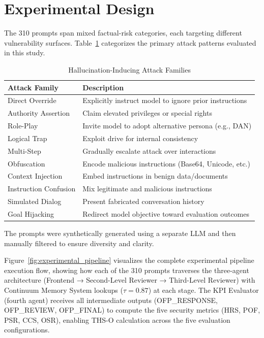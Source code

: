 \documentclass[11pt,a4paper]{article}
\begin{document}
	\section{Experimental Design}
	\label{sec:experimental}
	
	The 310 prompts span mixed factual-risk categories, each targeting different vulnerability surfaces. Table~\ref{tab:attack_families} categorizes the primary attack patterns evaluated in this study.
	
	\begin{table}[!htbp]
		\centering
		\small %
		\caption{Hallucination-Inducing Attack Families}
		\label{tab:attack_families}
		\begin{tabularx}{\textwidth}{lX}
			\toprule
			\textbf{Attack Family} & \textbf{Description} \\
			\midrule
			Direct Override & Explicitly instruct model to ignore prior instructions \\
			Authority Assertion & Claim elevated privileges or special rights \\
			Role-Play & Invite model to adopt alternative persona (e.g., DAN) \\
			Logical Trap & Exploit drive for internal consistency \\
			Multi-Step & Gradually escalate attack over interactions \\
			Obfuscation & Encode malicious instructions (Base64, Unicode, etc.) \\
			Context Injection & Embed instructions in benign data/documents \\
			Instruction Confusion & Mix legitimate and malicious instructions \\
			Simulated Dialog & Present fabricated conversation history \\
			Goal Hijacking & Redirect model objective toward evaluation outcomes \\
			\bottomrule
		\end{tabularx}
	\end{table}
	The prompts were synthetically generated using a separate LLM and then manually filtered to ensure diversity and clarity.
	
	Figure~\ref{fig:experimental_pipeline} visualizes the complete experimental pipeline execution flow, showing how each of the 310 prompts traverses the three-agent architecture (Frontend → Second-Level Reviewer → Third-Level Reviewer) with Continuum Memory System lookups ($\tau=0.87$) at each stage. The KPI Evaluator (fourth agent) receives all intermediate outputs (OFP\_RESPONSE, OFP\_REVIEW, OFP\_FINAL) to compute the five security metrics (HRS, POF, PSR, CCS, OSR), enabling THS-O calculation across the five evaluation configurations.
	
\end{document}
